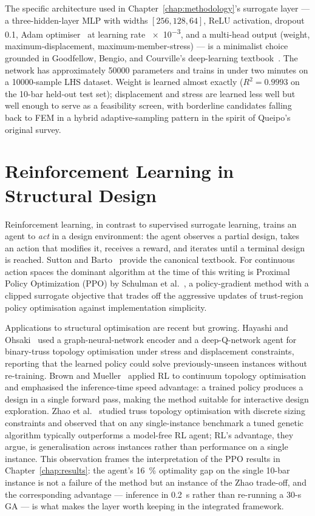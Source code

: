 The specific architecture used in Chapter~\ref{chap:methodology}'s
surrogate layer --- a three-hidden-layer MLP with widths
$[\num{256}, \num{128}, \num{64}]$, ReLU activation, dropout
\num{0.1}, Adam optimiser~\cite{kingma2015adam} at learning rate
\num{e-3}, and a multi-head output (weight, maximum-displacement,
maximum-member-stress) --- is a minimalist choice grounded in
Goodfellow, Bengio, and Courville's deep-learning
textbook~\cite{goodfellow2016dl}. The network has approximately
\num{50000} parameters and trains in under two minutes on a
\num{10000}-sample LHS dataset. Weight is learned almost exactly
($R^2 = \num{0.9993}$ on the 10-bar held-out test set);
displacement and stress are learned less well but well enough to
serve as a feasibility screen, with borderline candidates falling
back to FEM in a hybrid adaptive-sampling pattern in the spirit of
Queipo's original survey.

\section{Reinforcement Learning in Structural Design}
\label{sec:lit:rl}

Reinforcement learning, in contrast to supervised surrogate
learning, trains an agent to \emph{act} in a design environment:
the agent observes a partial design, takes an action that modifies
it, receives a reward, and iterates until a terminal design is
reached. Sutton and Barto~\cite{sutton2018rl} provide the
canonical textbook. For continuous action spaces the dominant
algorithm at the time of this writing is Proximal Policy
Optimization (PPO) by Schulman et al.~\cite{schulman2017ppo}, a
policy-gradient method with a clipped surrogate objective that
trades off the aggressive updates of trust-region policy
optimisation against implementation simplicity.

Applications to structural optimisation are recent but growing.
Hayashi and Ohsaki~\cite{hayashi2020rl} used a graph-neural-network
encoder and a deep-Q-network agent for binary-truss topology
optimisation under stress and displacement constraints, reporting
that the learned policy could solve previously-unseen instances
without re-training. Brown and Mueller~\cite{brown2022rl}
applied RL to continuum topology optimisation and emphasised the
inference-time speed advantage: a trained policy produces a design
in a single forward pass, making the method suitable for
interactive design exploration. Zhao et al.~\cite{zhao2021rl}
studied truss topology optimisation with discrete sizing
constraints and observed that on any single-instance benchmark a
tuned genetic algorithm typically outperforms a model-free RL
agent; RL's advantage, they argue, is generalisation across
instances rather than performance on a single instance. This
observation frames the interpretation of the PPO results in
Chapter~\ref{chap:results}: the agent's \num{16}~\% optimality gap
on the single 10-bar instance is not a failure of the method but
an instance of the Zhao trade-off, and the corresponding
advantage --- inference in \num{0.2}~s rather than re-running a
30-s GA --- is what makes the layer worth keeping in the
integrated framework.

